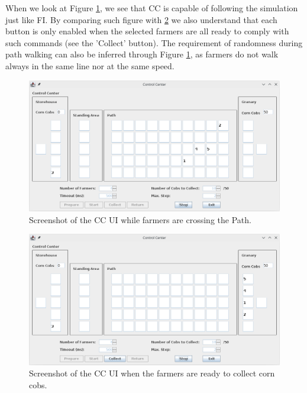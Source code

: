 \documentclass[12pt]{article}
\begin{document}
When we look at Figure \ref{UserInterface_CC_2}, we see that CC is capable of following the simulation just like FI.
By comparing such figure with \ref{UserInterface_CC_3} we also understand that each button is only enabled when the selected farmers are all ready to 
comply with such commands (see the 'Collect' button).
The requirement of randomness during path walking can also be inferred through Figure \ref{UserInterface_CC_2}, as farmers do not walk always in the same line 
nor at the same speed.

\vspace{-5pt}
\begin{figure}[H]
  \centering
  \begin{minipage}{.9\textwidth}
    \centering
    \includegraphics[width=\linewidth]{img/UserInterface_CC_2.png}
  \end{minipage}%
  \caption{Screenshot of the CC UI while farmers are crossing the Path.}
  \label{UserInterface_CC_2}
\end{figure} 
\vspace{-10pt}

\vspace{-10pt}
\begin{figure}[H]
  \centering
  \begin{minipage}{.9\textwidth}
    \centering
    \includegraphics[width=\linewidth]{img/UserInterface_CC_3.png}
  \end{minipage}%
  \caption{Screenshot of the CC UI when the farmers are ready to collect corn cobs.}
  \label{UserInterface_CC_3}
\end{figure} 
\vspace{-10pt}
\end{document}
